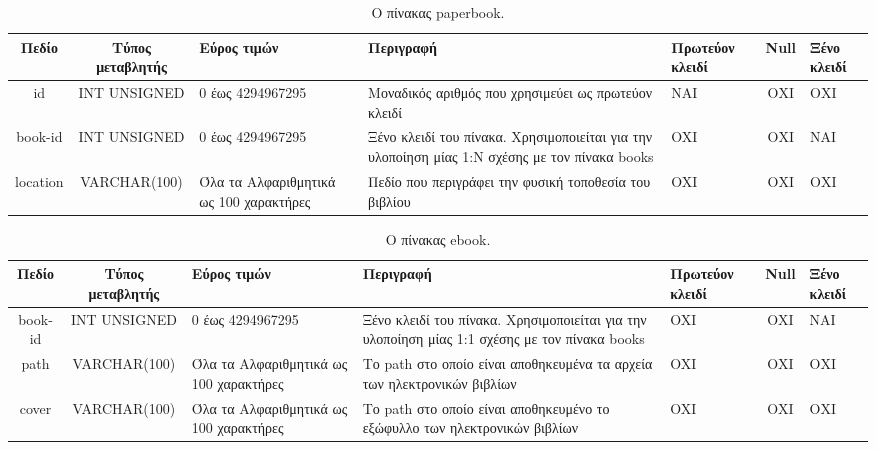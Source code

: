 \documentclass{assignment}
\begin{document}
\begin{landscape}
\begin{table}[htbp]
\begin{center}
  \begin{tabular}{|c|c|m{}|m{}|m{2.0cm}|c|m{1.5cm}|}
    \hline
    {\bf Πεδίο} & {\bf Τύπος μεταβλητής} & {\bf Εύρος τιμών} & {\bf Περιγραφή} & {\bf Πρωτεύον κλειδί} & {\bf Null} & {\bf Ξένο κλειδί} \\ \hline
    id & INT UNSIGNED & 0 έως 4294967295 & Μοναδικός αριθμός που χρησιμεύει ως πρωτεύον κλειδί & ΝΑΙ & ΟΧΙ & ΟΧΙ \\ \hline
    book-id & INT UNSIGNED & 0 έως 4294967295 & Ξένο κλειδί του πίνακα. Χρησιμοποιείται για την υλοποίηση μίας 1:Ν σχέσης με τον πίνακα books & OXI & ΟΧΙ & NAI \\ \hline
    location & VARCHAR(100) &  Όλα τα Αλφαριθμητικά ως 100 χαρακτήρες & Πεδίο που περιγράφει την φυσική τοποθεσία του βιβλίου & OXI & ΟΧΙ & ΟΧΙ \\ \hline
  \end{tabular}
\caption{Ο πίνακας paperbook.}
\label{table:db_table:paperbook}
\end{center}
\end{table}
\end{landscape}

\begin{landscape}
\begin{table}[htbp]
\begin{center}
  \begin{tabular}{|c|c|m{}|m{}|m{2.0cm}|c|m{1.5cm}|}
    \hline
    {\bf Πεδίο} & {\bf Τύπος μεταβλητής} & {\bf Εύρος τιμών} & {\bf Περιγραφή} & {\bf Πρωτεύον κλειδί} & {\bf Null} & {\bf Ξένο κλειδί} \\ \hline
    book-id & INT UNSIGNED & 0 έως 4294967295 & Ξένο κλειδί του πίνακα. Χρησιμοποιείται για την υλοποίηση μίας 1:1 σχέσης με τον πίνακα books & OXI & ΟΧΙ & NAI \\ \hline
    path & VARCHAR(100) &  Όλα τα Αλφαριθμητικά ως 100 χαρακτήρες & Το path στο οποίο είναι αποθηκευμένα τα αρχεία των ηλεκτρονικών βιβλίων & OXI & ΟΧΙ & ΟΧΙ \\ \hline
    cover & VARCHAR(100) &  Όλα τα Αλφαριθμητικά ως 100 χαρακτήρες & Το path στο οποίο είναι αποθηκευμένο το εξώφυλλο των ηλεκτρονικών βιβλίων & OXI & ΟΧΙ & ΟΧΙ \\ \hline
  \end{tabular}
\caption{Ο πίνακας ebook.}
\label{table:db_table:ebook}
\end{center}
\end{table}
\end{landscape}
\end{document}
